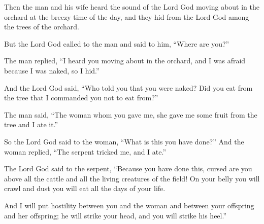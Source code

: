 \begin{scripture}
 Then the man and his wife heard the sound of the Lord God moving about in the orchard at the breezy time of the day, and they hid from the Lord God among the trees of the orchard.
 But the Lord God called to the man and said to him, ``Where are you?''
 The man replied, ``I heard you moving about in the orchard, and I was afraid because I was naked, so I hid.''
 And the Lord God said, ``Who told you that you were naked? Did you eat from the tree that I commanded you not to eat from?''
 The man said, ``The woman whom you gave me, she gave me some fruit from the tree and I ate it.''
 So the Lord God said to the woman, ``What is this you have done?'' And the woman replied, ``The serpent tricked me, and I ate.''
\everypar{}

 The Lord God said to the serpent, ``Because you have done this, cursed are you above all the cattle and all the living creatures of the field! On your belly you will crawl and dust you will eat all the days of your life.
\everypar{}

 And I will put hostility between you and the woman and between your offspring and her offspring; he will strike your head, and you will strike his heel.''
\everypar{}


\end{scripture}
